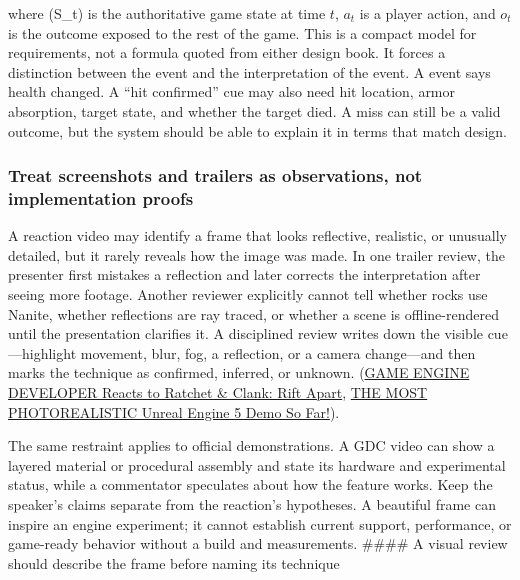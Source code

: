 where (S\_t) is the authoritative game state at time \(t\), \(a_t\) is a player action, and \(o_t\) is the outcome exposed to the rest of the game. This is a compact model for requirements, not a formula quoted from either design book. It forces a distinction between the event and the interpretation of the event. A  event says health changed. A ``hit confirmed'' cue may also need hit location, armor absorption, target state, and whether the target died. A miss can still be a valid outcome, but the system should be able to explain it in terms that match design.

\subsubsection{Treat screenshots and trailers as observations, not implementation proofs}\label{05-engine-i-ch009-treat-screenshots-and-trailers-as-observations-not-implementation-proofs}

\hypertarget{05-engine-i-ch009-treat-screenshots-and-trailers-as-observations-not-implementation-proofs}{}

A reaction video may identify a frame that looks reflective, realistic, or unusually detailed, but it rarely reveals how the image was made. In one trailer review, the presenter first mistakes a reflection and later corrects the interpretation after seeing more footage. Another reviewer explicitly cannot tell whether rocks use Nanite, whether reflections are ray traced, or whether a scene is offline-rendered until the presentation clarifies it. A disciplined review writes down the visible cue---highlight movement, blur, fog, a reflection, or a camera change---and then marks the technique as confirmed, inferred, or unknown. (\href{https://www.youtube.com/watch?v=qCSyy5BTDuc&t=0m0s}{GAME ENGINE DEVELOPER Reacts to Ratchet \& Clank: Rift Apart}, \href{https://www.youtube.com/watch?v=jbEfCcl7gOw&t=0m0s}{THE MOST PHOTOREALISTIC Unreal Engine 5 Demo So Far!}).

The same restraint applies to official demonstrations. A GDC video can show a layered material or procedural assembly and state its hardware and experimental status, while a commentator speculates about how the feature works. Keep the speaker's claims separate from the reaction's hypotheses. A beautiful frame can inspire an engine experiment; it cannot establish current support, performance, or game-ready behavior without a build and measurements. \#\#\#\# A visual review should describe the frame before naming its technique

